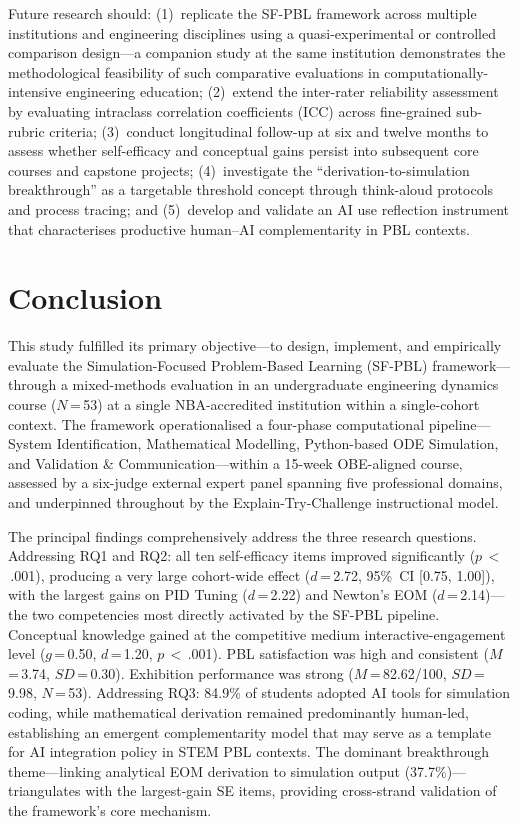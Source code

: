 \documentclass[utf8]{FrontiersinHarvard}
\begin{document}
Future research should: {\color{blue} (1)~replicate the SF-PBL framework across multiple
institutions and engineering disciplines using a quasi-experimental or
controlled comparison design---a companion study at the same institution
\citep{nanade2026cross} demonstrates the methodological feasibility of such
comparative evaluations in computationally-intensive engineering education;
(2)~extend the inter-rater reliability assessment by evaluating intraclass
correlation coefficients (ICC) across fine-grained sub-rubric criteria;
(3)~conduct longitudinal follow-up at six and twelve months to assess whether
self-efficacy and conceptual gains persist into subsequent core courses and
capstone projects;} (4)~investigate the ``derivation-to-simulation
breakthrough'' as a targetable threshold concept through think-aloud
protocols and process tracing; and (5)~develop and validate an AI use
reflection instrument that characterises productive human--AI
complementarity in PBL contexts.

\section{Conclusion}

{\color{blue} This study fulfilled its primary objective---to design, implement, and
empirically evaluate the Simulation-Focused Problem-Based Learning (SF-PBL)
framework---through a mixed-methods evaluation in an undergraduate
engineering dynamics course ($N$\,=\,53) at a single NBA-accredited
institution within a single-cohort context.} The framework operationalised
a four-phase computational pipeline---System Identification, Mathematical
Modelling, Python-based ODE Simulation, and Validation \&
Communication---within a 15-week OBE-aligned course, assessed by a six-judge
external expert panel spanning five professional domains, and underpinned
throughout by the Explain-Try-Challenge instructional model.

The principal findings comprehensively address the three research questions.
Addressing RQ1 and RQ2: all ten self-efficacy items improved significantly
($p$\,$<$\,.001), producing a very large cohort-wide effect ($d$\,=\,2.72,
95\%~CI [0.75, 1.00]), with the largest gains on PID Tuning ($d$\,=\,2.22)
and Newton's EOM ($d$\,=\,2.14)---the two competencies most directly
activated by the SF-PBL pipeline. Conceptual knowledge gained at the
competitive medium interactive-engagement level ($g$\,=\,0.50,
$d$\,=\,1.20, $p$\,$<$\,.001). PBL satisfaction was high and consistent
($M$\,=\,3.74, $SD$\,=\,0.30). Exhibition performance was strong
($M$\,=\,82.62/100, $SD$\,=\,9.98, $N$\,=\,53). Addressing RQ3: 84.9\%
of students adopted AI tools for simulation coding, while mathematical
derivation remained predominantly human-led, establishing an emergent
complementarity model that may serve as a template for AI integration
policy in STEM PBL contexts. The dominant breakthrough theme---linking
analytical EOM derivation to simulation output (37.7\%)---triangulates
with the largest-gain SE items, providing cross-strand validation of
the framework's core mechanism.
\end{document}
